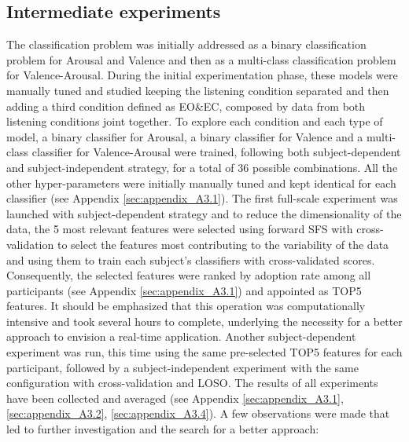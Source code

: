 \subsection{Intermediate experiments}
\label{sec:intermediate_experiments}
The classification problem was initially addressed as a binary classification problem for Arousal and Valence and then as a multi-class classification problem for Valence-Arousal. During the initial experimentation phase, these models were manually tuned and studied keeping the listening condition separated and then adding a third condition defined as EO\&EC, composed by data from both listening conditions joint together. To explore each condition and each type of model, a binary classifier for Arousal, a binary classifier for Valence and a multi-class classifier for Valence-Arousal were trained, following both subject-dependent and subject-independent strategy, for a total of 36 possible combinations. All the other hyper-parameters were initially manually tuned and kept identical for each classifier (see Appendix \ref{sec:appendix_A3.1}). The first full-scale experiment was launched with subject-dependent strategy and to reduce the dimensionality of the data, the 5 most relevant features were selected using forward \ac{SFS} with cross-validation to select the features most contributing to the variability of the data and using them to train each subject’s classifiers with cross-validated scores. Consequently, the selected features were ranked by adoption rate among all participants (see Appendix \ref{sec:appendix_A3.1}) and appointed as TOP5 features. It should be emphasized that this operation was computationally intensive and took several hours to complete, underlying the necessity for a better approach to envision a real-time application. Another subject-dependent experiment was run, this time using the same pre-selected TOP5 features for each participant, followed by a subject-independent experiment with the same configuration with cross-validation and \ac{LOSO}. The results of all experiments have been collected and averaged (see Appendix \ref{sec:appendix_A3.1}, \ref{sec:appendix_A3.2}, \ref{sec:appendix_A3.4}). A few observations were made that led to further investigation and the search for a better approach:
